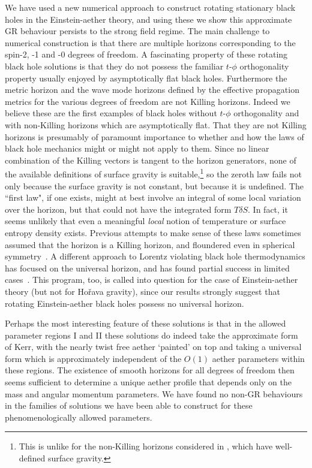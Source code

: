 \documentclass[12pt]{article}
\numberwithin{equation}{section}
\begin{document}
We have used
a new numerical approach to construct rotating stationary black holes in the Einstein-aether theory, and using these we show
 this approximate GR behaviour persists to the strong field regime. 
The main challenge to numerical construction is that there are multiple horizons corresponding to the spin-2, -1 and -0 degrees of freedom. 
 A fascinating property of these rotating black hole solutions
 is that they do not possess the familiar $t$-$\phi$ orthogonality property usually enjoyed by asymptotically flat black holes. Furthermore the metric horizon and the wave mode horizons defined by the effective propagation metrics for the various degrees of freedom are not Killing horizons.
 Indeed we believe these are the first examples of black holes without $t$-$\phi$ orthogonality and with non-Killing horizons 
 which are asymptotically flat.
That they are not Killing horizons is presumably of paramount importance
to whether and how the laws of black hole mechanics might or might not apply to them. 
Since no linear combination of the Killing vectors is tangent to the horizon generators, none of the available definitions of surface gravity is suitable,\footnote{This is unlike for the non-Killing horizons considered in \cite{Cropp:2013zxi}, which have well-defined surface gravity.} so the zeroth law fails not only because the surface gravity is not constant, but because it is undefined. The ``first law", if one exists, might at best involve an integral of some local variation over the horizon, but 
that could not have the integrated form $T\delta S$. In fact, 
it seems unlikely that even a meaningful {\it local} notion of temperature or surface entropy density exists.
Previous attempts to make sense of these laws sometimes assumed
that the horizon is a Killing horizon,
and floundered even in spherical symmetry~\cite{Foster:2005fr,Pacilio:2017emh,Ding:2020bwa}. 
A different approach to Lorentz violating 
black hole thermodynamics has focused on the universal horizon, and has found 
partial success in limited cases~\cite{Berglund:2012bu,Mohd:2013zca,Pacilio:2017swi}. 
This program, too, is called into question
for the case of Einstein-aether theory
(but not for Ho\v{r}ava gravity), since
our results strongly suggest that rotating Einstein-aether black holes possess no universal horizon.


Perhaps  the most interesting feature of these solutions is that in the allowed parameter regions I and II these solutions do indeed take the approximate form of Kerr, with the nearly twist free aether `painted' on top and taking a universal form which is approximately independent of the $O(1)$ aether parameters within these regions. The existence of smooth horizons for all degrees of freedom then seems sufficient to determine a unique aether profile that depends only on the mass and angular momentum parameters.
We have found no non-GR behaviours in the families of solutions we have been able to construct for these phenomenologically allowed parameters.
\end{document}

